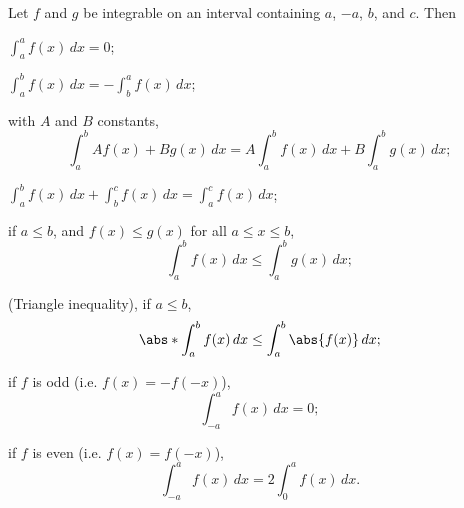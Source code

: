 \begin{theorem}
	Let $f$ and $g$ be integrable on an interval containing $a$, $-a$, $b$, and $c$.
	Then
	\begin{romanlist}
		\item $\displaystyle \int_a^a f(x) \, d x = 0$;
		\item $\displaystyle \int_a^b f(x) \, d x = - \int_b^a f(x) \, d x$;
		\item with $A$ and $B$ constants,
		\[
			\int_a^b A f(x) + B g(x) \, d x = A \int_a^b f(x) \, d x + B \int_a^b g(x) \, d x;
		\]
		\item $\displaystyle \int_a^b f(x) \, d x + \int_b^c f(x) \, d x = \int_a^c f(x) \, d x$;
		\item if $a \leq b$, and $f(x) \leq g(x)$ for all $a \leq x \leq b$,
		\[
			\int_a^b f(x) \, d x \leq \int_a^b g(x) \, d x;
		\]
		\item (Triangle inequality), if $a \leq b$,
		\[
			\abs*{\int_a^b f(x) \, d x} \leq \int_a^b \abs{f(x)} \, d x;
		\]
		\item if $f$ is odd (i.e. $f(x) = - f(-x)$),
		\[
			\int_{-a}^a f(x) \, d x = 0;
		\]
		\item if $f$ is even  (i.e. $f(x) = f(-x)$),
		\[
			\int_{-a}^a f(x) \, d x = 2 \int_0^a f(x) \, d x.
		\]
	\end{romanlist}
\end{theorem}

